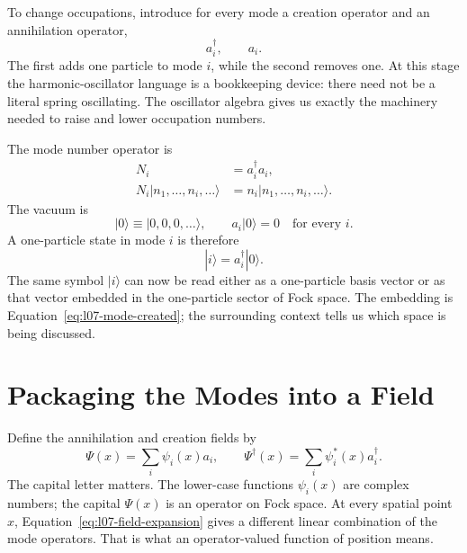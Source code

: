 To change occupations, introduce for every mode a creation operator and an annihilation operator,
\begin{equation}
a_i^\dagger,\qquad a_i.
\end{equation}
The first adds one particle to mode \(i\), while the second removes one. At this stage the harmonic-oscillator language is a bookkeeping device: there need not be a literal spring oscillating. The oscillator algebra gives us exactly the machinery needed to raise and lower occupation numbers.

The mode number operator is
\begin{equation}
\begin{aligned}
N_i&=a_i^\dagger a_i,\\
N_i|n_1,\ldots,n_i,\ldots\rangle
&=n_i|n_1,\ldots,n_i,\ldots\rangle.
\end{aligned}
\end{equation}
The vacuum is
\begin{equation}
|0\rangle\equiv|0,0,0,\ldots\rangle,
\qquad
a_i|0\rangle=0
\quad\text{for every }i.
\label{eq:l07-vacuum}
\end{equation}
A one-particle state in mode \(i\) is therefore
\begin{equation}
|i\rangle=a_i^\dagger|0\rangle.
\label{eq:l07-mode-created}
\end{equation}
The same symbol \(|i\rangle\) can now be read either as a one-particle basis vector or as that vector embedded in the one-particle sector of Fock space. The embedding is Equation~\eqref{eq:l07-mode-created}; the surrounding context tells us which space is being discussed.

\section{Packaging the Modes into a Field}

Define the annihilation and creation fields by
\begin{equation}
\Psi(x)=\sum_i \psi_i(x)a_i,
\qquad
\Psi^\dagger(x)=\sum_i \psi_i^*(x)a_i^\dagger.
\label{eq:l07-field-expansion}
\end{equation}
The capital letter matters. The lower-case functions \(\psi_i(x)\) are complex numbers; the capital \(\Psi(x)\) is an operator on Fock space. At every spatial point \(x\), Equation~\eqref{eq:l07-field-expansion} gives a different linear combination of the mode operators. That is what an operator-valued function of position means.

